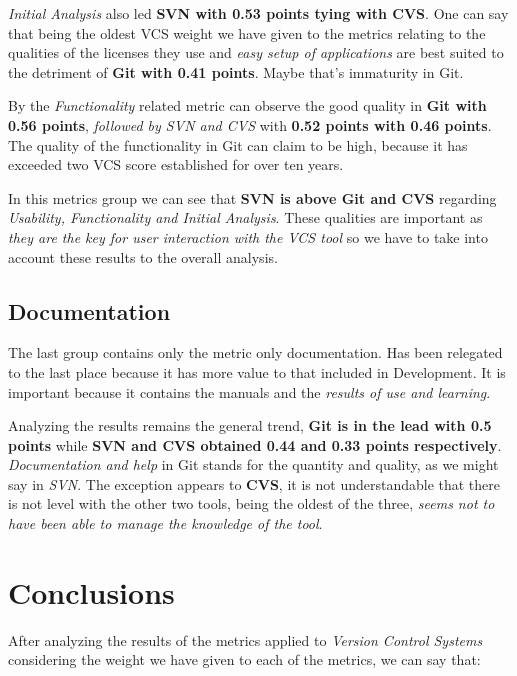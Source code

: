 \documentclass[11pt]{scrartcl}
\begin{document}
\par \emph{Initial Analysis} also led \textbf{SVN with 0.53 points tying with CVS}. One can say that being the oldest VCS weight we have given to the metrics relating to the qualities of the licenses they use and \emph{easy setup of applications} are best suited to the detriment of \textbf{Git with 0.41 points}. Maybe that's immaturity in Git.

\par By the \emph{Functionality} related metric can observe the good quality in \textbf{Git with 0.56 points}, \emph{followed by SVN and CVS} with \textbf{0.52 points with 0.46 points}. The quality of the functionality in Git can claim to be high, because it has exceeded two VCS score established for over ten years.

\par In this metrics group we can see that \textbf{SVN is above Git and CVS} regarding \emph{Usability, Functionality and Initial Analysis}. These qualities are important as \emph{they are the key for user interaction with the VCS tool} so we have to take into account these results to the overall analysis.

\subsection{Documentation}\label{sec:compare-doc}

\par The last group contains only the metric only documentation. Has been relegated to the last place because it has more value to that included in Development. It is important because it contains the manuals and the \emph{results of use and learning}.

\par Analyzing the results remains the general trend, \textbf{Git is in the lead with 0.5 points} while \textbf{SVN and CVS obtained 0.44 and 0.33 points respectively}. \emph{Documentation and help} in Git stands for the quantity and quality, as we might say in \emph{SVN}. The exception appears to \textbf{CVS}, it is not understandable that there is not level with the other two tools, being the oldest of the three, \emph{seems not to have been able to manage the knowledge of the tool}.

\section{Conclusions}

\par After analyzing the results of the metrics applied to \emph{Version Control Systems} considering the weight we have given to each of the metrics, we can say that:
\end{document}
